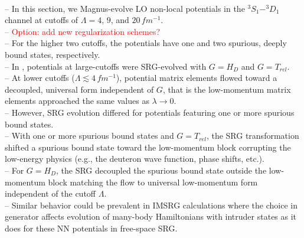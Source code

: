 \documentclass[preprintnumbers,floatfix,aps,prc,preprint,nofootinbib]{revtex4-1}
\begin{document}
\\
-- In this section, we Magnus-evolve LO non-local potentials in the $^{3}S_1-^{3}D_1$ channel at cutoffs of $\Lambda=4$, $9$, and $20 \, fm^{-1}$.
\\
\textcolor{red}{%
-- Option: add new regularization schemes?
}
\\
-- For the higher two cutoffs, the potentials have one and two spurious, deeply bound states, respectively.
\\
-- In \cite{Wendt:2011qj}, potentials at large-cutoffs were SRG-evolved with $G=H_D$ and $G=T_{rel}$.
\\
-- At lower cutoffs ($\Lambda \lesssim 4 \, fm^{-1}$), potential matrix elements flowed toward a decoupled, universal form independent of $G$, that is the low-momentum matrix elements approached the same values as $\lambda \rightarrow 0$.
\\
-- However, SRG evolution differed for potentials featuring one or more spurious bound states.
\\
-- With one or more spurious bound states and $G=T_{rel}$, the SRG transformation shifted a spurious bound state toward the low-momentum block corrupting the low-energy physics (e.g., the deuteron wave function, phase shifts, etc.).
\\
-- For $G=H_D$, the SRG decoupled the spurious bound state outside the low-momentum block matching the flow to universal low-momentum form independent of the cutoff $\Lambda$.
\\
-- Similar behavior could be prevalent in IMSRG calculations where the choice in generator affects evolution of many-body Hamiltonians with intruder states as it does for these NN potentials in free-space SRG.
\\
\end{document}
